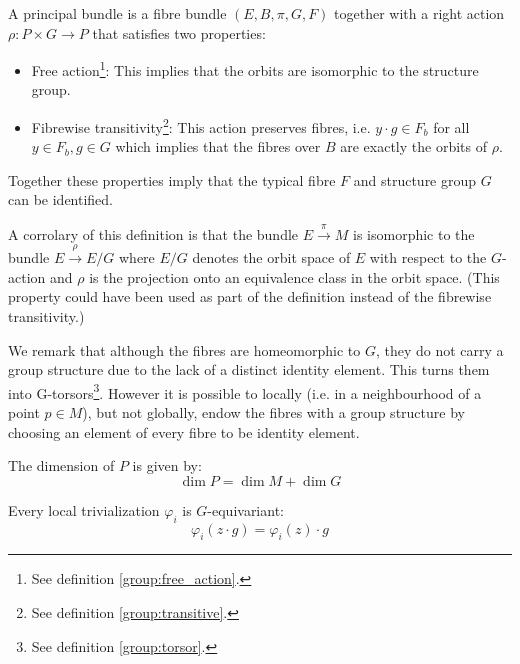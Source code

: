 	\begin{definition}
		A principal bundle is a fibre bundle $(E, B, \pi, G, F)$ together with a right action $\rho:P\times G\rightarrow P$ that satisfies two properties:
		\begin{itemize}
			\item Free action\footnote{See definition \ref{group:free_action}.}: This implies that the orbits are isomorphic to the structure group.
			\item Fibrewise transitivity\footnote{See definition \ref{group:transitive}.}: This action preserves fibres, i.e. $y\cdot g\in F_b$ for all $y\in F_b, g\in G$ which implies that the fibres over $B$ are exactly the orbits of $\rho$.
		\end{itemize}
		Together these properties imply that the typical fibre $F$ and structure group $G$ can be identified.
	\end{definition}
	\begin{property}
		A corrolary of this definition is that the bundle $E\xrightarrow{\pi}M$ is isomorphic to the bundle $E\xrightarrow{\rho}E/G$ where $E/G$ denotes the orbit space of $E$ with respect to the $G$-action and $\rho$ is the projection onto an equivalence class in the orbit space. (This property could have been used as part of the definition instead of the fibrewise transitivity.)
	\end{property}
	\begin{remark}
		We remark that although the fibres are homeomorphic to $G$, they do not carry a group structure due to the lack of a distinct identity element. This turns them into G-torsors\footnote{See definition \ref{group:torsor}.}. However it is possible to locally (i.e. in a neighbourhood of a point $p\in M$), but not globally, endow the fibres with a group structure by choosing an element of every fibre to be identity element.
	\end{remark}
	
	\begin{property}[Dimension]
		The dimension of $P$ is given by:
		\begin{equation}
			\label{manifolds:principal_bundle_dimension}
			\dim P = \dim M + \dim G
		\end{equation}
	\end{property}

	\begin{property}
		Every local trivialization $\varphi_i$ is $G$-equivariant:
		\begin{equation}
			\varphi_i(z\cdot g) = \varphi_i(z)\cdot g
		\end{equation}
	\end{property}
	
